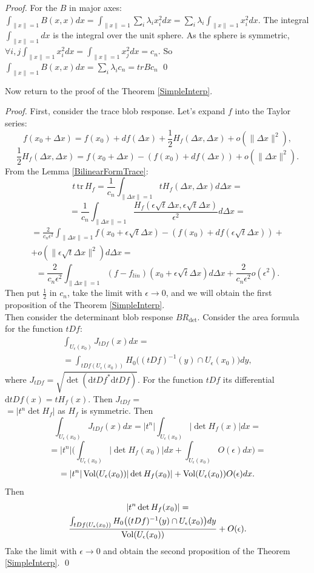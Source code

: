 \documentclass[twocolumn]{svjour3}          %
\newcommand{\Vol}{\mathop{\rm Vol}}
\newcommand{\Ueps}{U_{\epsilon}}
\newcommand{\delx}{\Delta x}
\newcommand{\Diff}{\mathrm{d}}
\newcommand {\tr}{{\,}\mathrm{tr}{\,}}
\begin{document}
\begin{proof}
For the $B$ in major axes: $\int_{\|x\|=1} B(x, x) dx = \int_{\|x\|=1} \sum_i \lambda_i x_i^2 dx = \sum_i \lambda_i \int_{\|x\|=1} x_i^2 dx$.
The integral $\int_{\|x\|=1} dx$ is the integral over the unit sphere. As the sphere is symmetric, $\forall i, j \int_{\|x\|=1} x_i^2 dx = \int_{\|x\|=1} x_j^2 dx = c_n$. So $\int_{\|x\|=1} B(x, x) dx = \sum_i \lambda_i c_n = tr B c_n$ \qed
\end {proof}
Now return to the proof of the Theorem \ref{SimpleInterp}.
\begin{proof}
First, consider the trace blob response. Let's expand $f$ into the Taylor series: 
$$f(x_0 + \delx) = f(x_0) + df(\delx) + \frac{1}{2} H_f(\delx, \delx) + o(\|\delx \|^2),$$
$$\frac{1}{2} H_f(\delx, \delx) = f(x_0 + \delx) - ( f(x_0) + df(\delx) ) + o(\|\delx \|^2).$$
From the Lemma \ref{BilinearFormTrace}: 
$$t \tr H_f = \frac{1} {c_n} \int_{\|\delx\|=1} t H_f(\delx, \delx) d\delx = $$
$$ = \frac{1} {c_n} \int_{\|\delx\|=1} \frac{H_f(\epsilon \sqrt{t} \delx, \epsilon \sqrt{t} \delx)} {\epsilon^2} d\delx = $$
\begin{multline*} = \frac{2} {c_n \epsilon^2} \int_{\|\delx\|=1} f(x_0 + \epsilon \sqrt{t} \delx) - ( f(x_0) + df(\epsilon \sqrt{t} \delx) ) +
\\
+ o(\|\epsilon \sqrt{t} \delx \|^2) d\delx = \end{multline*}
$$ = \frac{2} {c_n \epsilon^2} \int_{\|\delx\|=1} (f-f_{lin})(x_0 + \epsilon \sqrt{t} \delx) d\delx + \frac{2}{c_n \epsilon^2}o(\epsilon^2). $$ 
Then put $\frac{1}{2}$ in $c_n$, take the limit with $\epsilon \to 0$, and we will obtain the first proposition of the Theorem \ref{SimpleInterp}.
\\
Then consider the determinant blob response $BR_{\det}$. Consider the area formula \cite{CartesianCurr} for the function $tDf$:
\begin{multline*}\int_{\Ueps(x_0)} J_{tDf}(x) dx = \\
= \int_{tDf(\Ueps(x_0))} H_0 \big((tDf)^{-1}(y)  \cap \Ueps(x_0)\big) dy,\end{multline*}
where $J_{tDf} = \sqrt{\det(\Diff tDf^* \Diff tDf)}$. For the function $tDf$ its differential $\Diff tDf(x) = t H_f(x)$. Then $J_{tDf} =$
\\
$= |t^n \det H_f|$ as $H_f$ is symmetric. Then
$$\int_{\Ueps(x_0)} J_{tDf}(x) dx = |t^n| \int_{\Ueps(x_0)} |\det H_f(x)| dx = $$
$$ = |t^n| \Big( \int_{\Ueps(x_0)} |\det H_f(x_0)| dx + \int_{\Ueps(x_0)} O(\epsilon) dx\Big) = $$
$$ = |t^n| \Vol(\Ueps(x_0)) |\det H_f(x_0)|  + \Vol(\Ueps(x_0)) O(\epsilon) dx.$$
Then 
\begin{multline*} |t^n \det H_f(x_0)| = 
\\
\frac{
		\int_{tDf(\Ueps(x_0))} H_0 \big((tDf)^{-1}(y) \cap \Ueps(x_0) \big) dy} 
		{\Vol(\Ueps(x_0))} + O(\epsilon).\end{multline*}
Take the limit with $\epsilon \to 0$ and obtain the second proposition of the Theorem \ref{SimpleInterp}. \qed
\end {proof}
\end{document}
